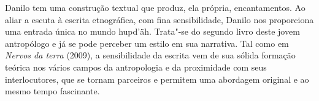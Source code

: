 Danilo tem uma construção textual que produz, ela própria,
encantamentos. Ao aliar a escuta à escrita etnográfica, com fina
sensibilidade, Danilo nos proporciona uma entrada única no mundo
hupd'äh. Trata"-se do segundo livro deste jovem antropólogo e já se pode
perceber um estilo em sua narrativa. Tal como em \textit{Nervos da terra}
(2009), a sensibilidade da escrita vem de sua sólida formação
teórica nos vários campos da antropologia e da proximidade com seus
interlocutores, que se tornam parceiros e permitem uma abordagem
original e ao mesmo tempo fascinante.


